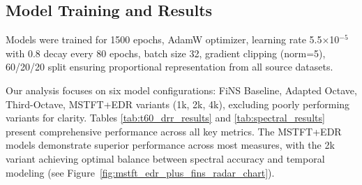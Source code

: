 \documentclass[conference]{IEEEtran}
\begin{document}
\subsection{Model Training and Results}
 
Models were trained for 1500 epochs, AdamW optimizer, learning rate 5.5$\times$10$^{-5}$ with 0.8 decay every 80 epochs, batch size 32, gradient clipping (norm=5), 60/20/20 split ensuring proportional representation from all source datasets.
 
 
\begin{table}[!htbp]
\centering
\caption{Model Robustness: Standard Deviations Across Datasets}
\vspace{-0.2cm}
\label{tab:robustness}
\vspace{-0.2cm}
\end{table}
 
Our analysis focuses on six model configurations: FiNS Baseline, Adapted Octave, Third-Octave, MSTFT+EDR variants (1k, 2k, 4k), excluding poorly performing variants for clarity.  Tables \ref{tab:t60_drr_results} and \ref{tab:spectral_results} present comprehensive performance across all key metrics. The MSTFT+EDR models demonstrate superior performance across most measures, with the 2k variant achieving optimal balance between spectral accuracy and temporal modeling (see Figure~\ref{fig:mstft_edr_plus_fins_radar_chart}).
 
\end{document}
